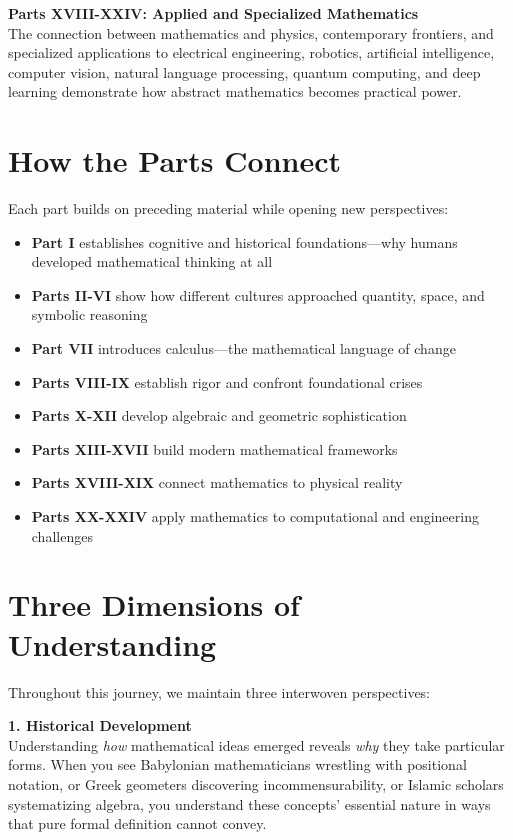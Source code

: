 \textbf{Parts XVIII-XXIV: Applied and Specialized Mathematics}\\
The connection between mathematics and physics, contemporary frontiers, and specialized applications to electrical engineering, robotics, artificial intelligence, computer vision, natural language processing, quantum computing, and deep learning demonstrate how abstract mathematics becomes practical power.

\section*{How the Parts Connect}

Each part builds on preceding material while opening new perspectives:

\begin{itemize}
    \item \textbf{Part I} establishes cognitive and historical foundations—why humans developed mathematical thinking at all
    \item \textbf{Parts II-VI} show how different cultures approached quantity, space, and symbolic reasoning
    \item \textbf{Part VII} introduces calculus—the mathematical language of change
    \item \textbf{Parts VIII-IX} establish rigor and confront foundational crises
    \item \textbf{Parts X-XII} develop algebraic and geometric sophistication
    \item \textbf{Parts XIII-XVII} build modern mathematical frameworks
    \item \textbf{Parts XVIII-XIX} connect mathematics to physical reality
    \item \textbf{Parts XX-XXIV} apply mathematics to computational and engineering challenges
\end{itemize}

\section*{Three Dimensions of Understanding}

Throughout this journey, we maintain three interwoven perspectives:

\textbf{1. Historical Development}\\
Understanding \textit{how} mathematical ideas emerged reveals \textit{why} they take particular forms. When you see Babylonian mathematicians wrestling with positional notation, or Greek geometers discovering incommensurability, or Islamic scholars systematizing algebra, you understand these concepts' essential nature in ways that pure formal definition cannot convey.

